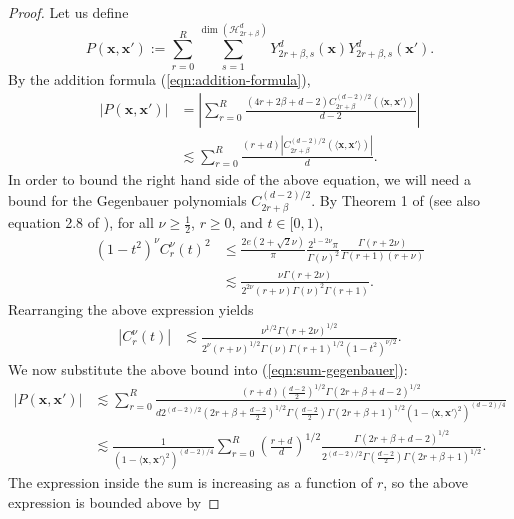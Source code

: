 \documentclass{article}
\theoremstyle{definition}
\newcommand{\mc}{\mathcal}
\def\vx{{\bm{x}}}
\begin{document}
\begin{proof}
Let us define
\[P(\vx, \vx') := \sum_{r = 0}^R \sum_{s= 1}^{\dim(\mc{H}_{2r + \beta}^d) }Y_{2r + \beta, s}^d(\vx) Y_{2r + \beta, s}^d(\vx'). \]
By the addition formula (\ref{eqn:addition-formula}),
   \begin{align}
       |P(\vx, \vx')| &= \left|\sum_{r = 0}^R \frac{(4r + 2\beta + d - 2)C_{2r + \beta}^{(d-2)/2}(\langle \vx, \vx' \rangle)  }{d - 2} \right|\nonumber\\
       &\lesssim \sum_{r = 0}^R \frac{(r + d)|C_{2r + \beta}^{(d - 2)/2}(\langle \vx, \vx' \rangle)|  }{d}.\label{eqn:sum-gegenbauer}
   \end{align}
   In order to bound the right hand side of the above equation, we will need a bound for the Gegenbauer polynomials $C_{2r + \beta}^{(d - 2)/2}$. By Theorem 1 of \cite{nevai1994generalized} (see also equation 2.8 of \citealt{xie2013exponential}), for all $\nu \geq \frac{1}{2}$, $r \geq 0$, and $t \in [0, 1)$,
   \begin{align*}
       (1 - t^2)^{\nu} C_r^{\nu}(t)^2 &\leq \frac{2e(2 + \sqrt{2}\nu) }{\pi}\frac{2^{1 - 2\nu}\pi }{\Gamma(\nu)^2 }\frac{\Gamma(r + 2\nu) }{\Gamma(r + 1)(r + \nu) }\\
       &\lesssim \frac{\nu\Gamma(r + 2\nu) }{2^{2\nu}(r + \nu)\Gamma(\nu)^2 \Gamma(r + 1) }.
   \end{align*}
   Rearranging the above expression yields
   \begin{align*}
       |C_r^{\nu}(t)| &\lesssim \frac{\nu^{1/2}\Gamma(r + 2\nu)^{1/2}  }{2^{\nu}(r + \nu)^{1/2}\Gamma(\nu)\Gamma(r + 1)^{1/2}(1 - t^2)^{\nu/2} }.
   \end{align*}
   We now substitute the above bound into (\ref{eqn:sum-gegenbauer}):
   \begin{align*}
       |P(\vx, \vx')| &\lesssim \sum_{r = 0}^R \frac{(r + d)\left(\frac{d - 2}{2}\right)^{1/2}\Gamma\left(2r + \beta + d - 2\right)^{1/2}   }{d 2^{(d - 2)/2 }\left(2r + \beta + \frac{d - 2}{2}\right)^{1/2}\Gamma\left(\frac{d - 2}{2}\right)\Gamma(2r + \beta +  1)^{1/2}(1 - \langle \vx, \vx' \rangle^2)^{(d - 2)/4}  }\\
       &\lesssim \frac{1}{(1 - \langle \vx, \vx'\rangle^2)^{(d - 2)/4} }\sum_{r = 0}^R \left(\frac{r + d}{d}\right)^{1/2} \frac{\Gamma(2r + \beta + d - 2)^{1/2} }{2^{(d - 2)/2}\Gamma\left(\frac{d - 2}{2}\right)\Gamma(2r + \beta + 1)^{1/2}}.
   \end{align*}
   The expression inside the sum is increasing as a function of $r$, so the above expression is bounded above by

\end{proof}
\end{document}
